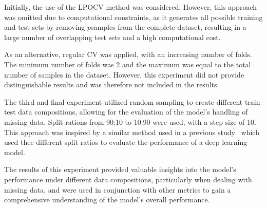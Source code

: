 Initially, the use of the \ac{LPOCV} method was considered.
However, this approach was omitted due to computational constraints, as it generates all possible
training and test sets by removing \(p\)samples from the complete dataset, resulting in a large
number of overlapping test sets and a high computational cost.

As an alternative, regular \ac{CV} was applied, with an increasing number of folds.
The minimum number of folds was 2 and the maximum was equal to the total number of samples in the
dataset.
However, this experiment did not provide distinguishable results and was therefore not
included in the results.

The third and final experiment utilized random sampling to create different train-
test data compositions, allowing for the evaluation of the model's handling of missing data.
Split rations from 90:10 to 10:90 were used, with a step size of 10. This approach was inspired by a
similar method used in a previous study~\cite[p. 570--574]{liu2021deep}  which used thee different
split ratios to evaluate the performance of a deep learning model.


The results of this experiment provided valuable insights into the model's performance under
different data compositions, particularly when dealing with missing
data, and were used in conjunction with other metrics to gain a comprehensive understanding of
the model's overall performance.


